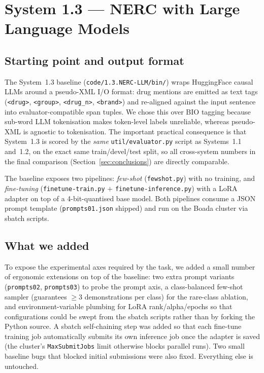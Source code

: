 \documentclass[a4paper,12pt]{article}
\begin{document}
\section{System 1.3 — NERC with Large Language Models}

\subsection{Starting point and output format}
\label{sec:13-start}

The System~1.3 baseline (\texttt{code/1.3.NERC-LLM/bin/}) wraps
HuggingFace causal LLMs around a pseudo-XML I/O format: drug mentions
are emitted as text tags (\texttt{<drug>}, \texttt{<group>},
\texttt{<drug\_n>}, \texttt{<brand>}) and re-aligned against the input
sentence into evaluator-compatible span tuples. We chose this over BIO
tagging because sub-word LLM tokenisation makes token-level labels
unreliable, whereas pseudo-XML is agnostic to tokenisation. The
important practical consequence is that System~1.3 is scored by the
\emph{same} \texttt{util/evaluator.py} script as Systems~1.1 and~1.2,
on the exact same train/devel/test split, so all cross-system numbers
in the final comparison (Section~\ref{sec:conclusions}) are directly
comparable.

The baseline exposes two pipelines: \emph{few-shot} (\texttt{fewshot.py})
with no training, and \emph{fine-tuning} (\texttt{finetune-train.py}
$+$ \texttt{finetune-inference.py}) with a LoRA adapter on top of a
4-bit-quantised base model. Both pipelines consume a JSON prompt
template (\texttt{prompts01.json} shipped) and run on the Boada
cluster via sbatch scripts.

\subsection{What we added}
\label{sec:13-mods}

To expose the experimental axes required by the task, we added a
small number of ergonomic extensions on top of the baseline:
two extra prompt variants (\texttt{prompts02}, \texttt{prompts03}) to
probe the prompt axis, a class-balanced few-shot sampler (guarantees
$\geq$3 demonstrations per class) for the rare-class ablation, and
environment-variable plumbing for LoRA rank/alpha/epochs so that
configurations could be swept from the sbatch scripts rather than by
forking the Python source. A sbatch self-chaining step was added so
that each fine-tune training job automatically submits its own
inference job once the adapter is saved (the cluster's
\texttt{MaxSubmitJobs} limit otherwise blocks parallel runs).
Two small baseline bugs that blocked initial submissions were also
fixed. Everything else is untouched.
\end{document}
